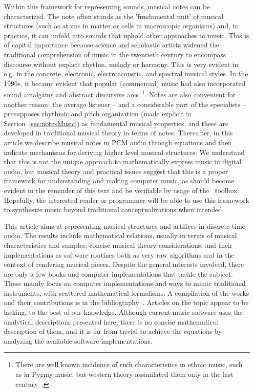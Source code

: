 Within this framework for representing sounds,
musical notes can be characterized.
The note often stands as the 'fundamental unit' of musical structures
(such as atoms in matter or cells in macroscopic organisms) and,
in practice, it can unfold into sounds that uphold other approaches to music.
This is of capital importance because science and scholastic artists
widened the traditional comprehension of music in the twentieth century
to encompass discourse without explicit rhythm, melody or harmony.
This is very evident in e.g. in the concrete, electronic, electroacoustic,
and spectral musical styles.
In the 1990s, it became evident that popular
(commercial) music had also incorporated
sound amalgams and abstract discursive arcs~\footnote{There
are well known incidence of such characteristics in ethnic music,
such as in Pygmy music, but western theory assimilated them
only in the last century~\cite{Wisnick}.}.
Notes are also convenient for another reason:
the average listener -- and a considerable part of the specialists --
presupposes rhythmic and pitch organization 
(made explicit in Section~\ref{sec:notesMusic})
as fundamental musical properties,
and these are developed in traditional musical theory in terms of notes.
Thereafter, in this article we describe musical notes in PCM audio through equations
and then indicate mechanisms for deriving higher level musical structures.
We understand that this is not the unique approach to mathematically express music in
digital audio, but musical theory and practical issues suggest that
this is a proper framework for understanding and making computer music,
as should become evident in the reminder of this text and be verifiable
by usage of the \massa\ toolbox.
Hopefully, the interested reader or programmer will be able to use
this framework to synthesize music beyond traditional conceptualizations when intended.

This article aims at representing musical structures and artifices
in discrete-time audio.
The results include mathematical relations,
usually in terms of musical characteristics and samples,
concise musical theory considerations,
and their implementations as software routines both as
very raw algorithms and in the context of rendering musical pieces.
Despite the general interests involved,
there are only a few books and computer implementations that tackle the subject.
These mainly focus on computer implementations and ways to mimic traditional instruments,
with scattered mathematical formalisms.
A compilation of the works and their contributions is in the bibliography~\cite{dissertacao}.
Articles on the topic appear to be lacking, to the best of our knowledge.
Although current music software uses the analytical descriptions presented here,
there is no concise mathematical description of them, and it is far from trivial
to achieve the equations by analyzing the available software implementations.


